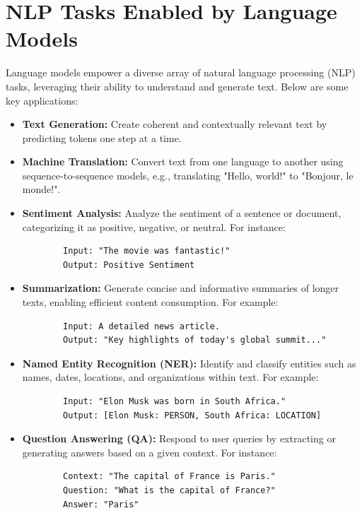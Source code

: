\section{NLP Tasks Enabled by Language Models}

    \large Language models empower a diverse array of natural language processing (NLP) tasks, leveraging their ability to understand and generate text. Below are some key applications:

    \begin{itemize}
        \item \textbf{Text Generation:} Create coherent and contextually relevant text by predicting tokens one step at a time.
        \item \textbf{Machine Translation:} Convert text from one language to another using sequence-to-sequence models, e.g., translating "Hello, world!" to "Bonjour, le monde!".
        \item \textbf{Sentiment Analysis:} Analyze the sentiment of a sentence or document, categorizing it as positive, negative, or neutral. For instance:
        \begin{verbatim}
        Input: "The movie was fantastic!"
        Output: Positive Sentiment
        \end{verbatim}
        \item \textbf{Summarization:} Generate concise and informative summaries of longer texts, enabling efficient content consumption. For example:
        \begin{verbatim}
        Input: A detailed news article.
        Output: "Key highlights of today's global summit..."
        \end{verbatim}
        \item \textbf{Named Entity Recognition (NER):} Identify and classify entities such as names, dates, locations, and organizations within text. For example:
        \begin{verbatim}
        Input: "Elon Musk was born in South Africa."
        Output: [Elon Musk: PERSON, South Africa: LOCATION]
        \end{verbatim}
        \item \textbf{Question Answering (QA):} Respond to user queries by extracting or generating answers based on a given context. For instance:
        \begin{verbatim}
        Context: "The capital of France is Paris."
        Question: "What is the capital of France?"
        Answer: "Paris"
        \end{verbatim}
    \end{itemize}

